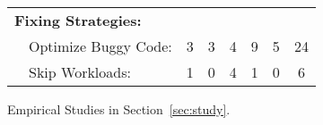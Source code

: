 \begin{table}[tb!]
\begin{adjustwidth}{-.5in}{-.5in}
{{\begin{tabular}{|lcccccc|}
\multicolumn{7}{|l|}{\bf Fixing Strategies:}\\
\ \ {{Optimize Buggy Code:}}              								&  3        &    3       &   4    &    9         &   5      &  24 \\
\ \ {Skip Workloads:}              									&  1        &    0       &   4    &    1         &   0      &   6\\
\hline
\end{tabular}
}
}
\end{adjustwidth}
\vspace{0.1in}
{Empirical Studies in Section~\ref{sec:study}.}
{}
\vspace{-0.2in}
\end{table}
